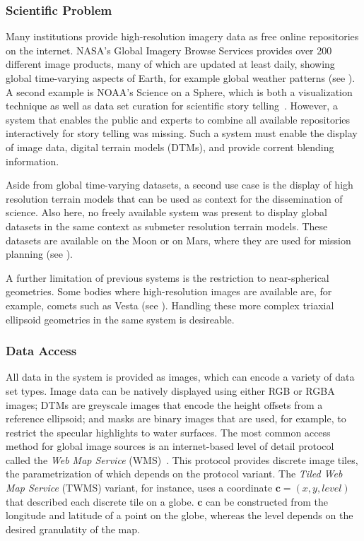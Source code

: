 \subsubsection{Scientific Problem} \label{contributions:astro:gb:problem}
Many institutions provide high-resolution imagery data as free online repositories on the internet.  NASA's Global Imagery Browse Services provides over 200 different image products, many of which are updated at least daily, showing global time-varying aspects of Earth, for example global weather patterns (see ).  A second example is NOAA's Science on a Sphere, which is both a visualization technique as well as data set curation for scientific story telling~\cite{ma2012scientific}.  However, a system that enables the public and experts to combine all available repositories interactively for story telling was missing.  Such a system must enable the display of image data, digital terrain models (DTMs), and provide corrent blending information.

Aside from global time-varying datasets, a second use case is the display of high resolution terrain models that can be used as context for the dissemination of science.  Also here, no freely available system was present to display global datasets in the same context as submeter resolution terrain models.  These datasets are available on the Moon or on Mars, where they are used for mission planning (see ).

A further limitation of previous systems is the restriction to near-spherical geometries.  Some bodies where high-resolution images are available are, for example, comets such as Vesta (see ).  Handling these more complex triaxial ellipsoid geometries in the same system is desireable.


\subsubsection{Data Access} \label{contributions:astro:gb:access}
All data in the system is provided as  images, which can encode a variety of data set types.  Image data can be natively displayed using either RGB or RGBA images;  DTMs are greyscale images that encode the height offsets from a reference ellipsoid;  and masks are binary images that are used, for example, to restrict the specular highlights to water surfaces.  The most common access method for global image sources is an internet-based level of detail protocol called the \emph{Web Map Service} (WMS)~\cite{open2006opengis, maso2010opengis}.  This protocol provides discrete image tiles, the parametrization of which depends on the protocol variant.  The \emph{Tiled Web Map Service} (TWMS) variant, for instance, uses a  coordinate $\textbf{c} = (x,y,level)$ that described each discrete tile on a globe.  $\textbf{c}$ can be constructed from the longitude and latitude of a point on the globe, whereas the level depends on the desired granulatity of the map.

